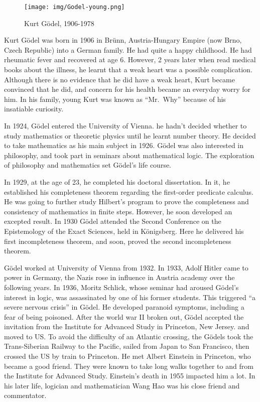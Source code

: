 \documentclass{article}
\begin{document}
\begin{figure}
 \centering
 \texttt{[image: img/Godel-young.png]}
 \captionsetup{labelformat=empty}
 \caption{Kurt Gödel, 1906-1978}
 \label{fig:Godel-young}
\end{figure}

Kurt Gödel was born in 1906 in Brünn, Austria-Hungary Empire (now Brno, Czech Republic) into a German family. He had quite a happy childhood. He had rheumatic fever and recovered at age 6. However, 2 years later when read medical books about the illness, he learnt that a weak heart was a possible complication. Although there is no evidence that he did have a weak heart, Kurt became convinced that he did, and concern for his health became an everyday worry for him. In his family, young Kurt was known as ``Mr.\ Why'' because of his insatiable curiosity.

In 1924, Gödel entered the University of Vienna. he hadn't decided whether to study mathematics or theoretic physics until he learnt number theory. He decided to take mathematics as his main subject in 1926. Gödel was also interested in philosophy, and took part in seminars about mathematical logic. The exploration of philosophy and mathematics set Gödel's life course.

In 1929, at the age of 23, he completed his doctoral dissertation. In it, he established his completeness theorem regarding the first-order predicate calculus. He was going to further study Hilbert's program to prove the completeness and consistency of mathematics in finite steps. However, he soon developed an excepted result. In 1930 Gödel attended the Second Conference on the Epistemology of the Exact Sciences, held in Königsberg. Here he delivered his first incompleteness theorem, and soon, proved the second incompleteness theorem.

Gödel worked at University of Vienna from 1932. In 1933, Adolf Hitler came to power in Germany, the Nazis rose in influence in Austria academy over the following years. In 1936, Moritz Schlick, whose seminar had aroused Gödel's interest in logic, was assassinated by one of his former students. This triggered ``a severe nervous crisis'' in Gödel. He developed paranoid symptoms, including a fear of being poisoned. After the world war II broken out, Gödel accepted the invitation from the Institute for Advanced Study in Princeton, New Jersey. and moved to US. To avoid the difficulty of an Atlantic crossing, the Gödels took the Trans-Siberian Railway to the Pacific, sailed from Japan to San Francisco, then crossed the US by train to Princeton. He met Albert Einstein in Princeton, who became a good friend. They were known to take long walks together to and from the Institute for Advanced Study. Einstein's death in 1955 impacted him a lot. In his later life, logician and mathematician Wang Hao was his close friend and commentator.
\end{document}
